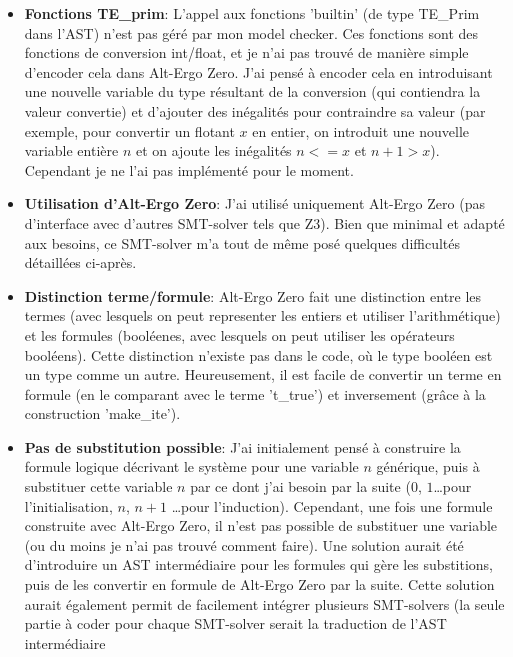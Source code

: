 \documentclass[a4paper]{article}%
\begin{document}
	\begin{itemize}
		\item \textbf{Fonctions TE\_prim}: L'appel aux fonctions 'builtin' (de type TE\_Prim dans l'AST) n'est pas géré par mon model checker.
		Ces fonctions sont des fonctions de conversion int/float, et je n'ai pas trouvé de manière simple d'encoder cela dans Alt-Ergo Zero.
		J'ai pensé à encoder cela en introduisant une nouvelle variable du type résultant de la conversion (qui contiendra la valeur convertie)
		et d'ajouter des inégalités pour contraindre sa valeur (par exemple, pour convertir un flotant $x$ en entier, on introduit une nouvelle
		variable entière $n$ et on ajoute les inégalités $n <= x$ et $n+1 > x$). Cependant je ne l'ai pas implémenté pour le moment.\\
		\item \textbf{Utilisation d'Alt-Ergo Zero}: J'ai utilisé uniquement Alt-Ergo Zero (pas d'interface avec d'autres SMT-solver tels que Z3).
		Bien que minimal et adapté aux besoins, ce SMT-solver m'a tout de même posé quelques difficultés détaillées ci-après.\\
		\item \textbf{Distinction terme/formule}: Alt-Ergo Zero fait une distinction entre les termes (avec lesquels on peut representer les entiers
		et utiliser l'arithmétique) et les formules (booléenes, avec lesquels on peut utiliser les opérateurs booléens).
		Cette distinction n'existe pas dans le code, où le type booléen est un type comme un autre.
		Heureusement, il est facile de convertir un terme en formule (en le comparant avec le terme 't\_true') et inversement (grâce à la construction 'make\_ite').\\
		\item \textbf{Pas de substitution possible}: J'ai initialement pensé à construire la formule logique décrivant le système pour une variable $n$ générique,
		puis à substituer cette variable $n$ par ce dont j'ai besoin par la suite ($0$, $1$\dots pour l'initialisation, $n$, $n+1$ \ldots pour l'induction).
		Cependant, une fois une formule construite avec Alt-Ergo Zero, il n'est pas possible de substituer une variable (ou du moins je n'ai pas trouvé comment faire).
		Une solution aurait été d'introduire un AST intermédiaire pour les formules qui gère les substitions, puis de les convertir en formule de Alt-Ergo Zero par la suite.
		Cette solution aurait également permit de facilement intégrer plusieurs SMT-solvers (la seule partie à coder pour chaque SMT-solver serait la traduction de l'AST intermédiaire

\end{itemize}
\end{document}
